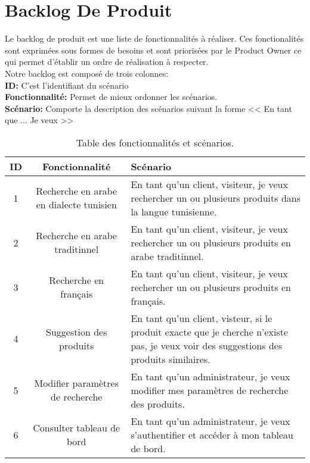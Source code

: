 \section{Backlog De Produit}
\noindent
\large
Le backlog de produit est une liste de fonctionnalités à réaliser. Ces fonctionalités sont exprimées sous formes de besoins et sont priorisées par le Product Owner ce qui permet d'établir un ordre de réalisation à respecter. \\
Notre backlog est composé de trois colonnes: \\
\textbf{ID: } C'est l'identifiant du scénario \\
\textbf{Fonctionnalité: } Permet de mieux ordonner les scénarios. \\
\textbf{Scénario: } Comporte la description des scénarios suivant la forme << En tant que ... Je veux >> \\

\begin{table}[H]
	\centering
	\begin{tabular}{|c|c|p{10cm}|}
		\hline
		\rowcolor{blue!20}
		\textbf{ID} & \textbf{Fonctionnalité}                 & \textbf{Scénario}                                                                                                                      \\ \hline
		1           & Recherche en arabe en dialecte tunisien & En tant qu'un client, visiteur, je veux rechercher un ou plusieurs produits dans la langue tunisienne.                                 \\ \hline
		2           & Recherche en arabe traditinnel            & En tant qu'un client, visiteur, je veux rechercher un ou plusieurs produits en arabe traditinnel.                                        \\ \hline
		3           & Recherche en français                   & En tant qu'un client, visiteur, je veux rechercher un ou plusieurs produits en français.                                               \\ \hline
		4           & Suggestion des produits                 & En tant qu'un client, visteur, si le produit exacte que je cherche n'existe pas, je veux voir des suggestions des produits similaires. \\ \hline

		5           & Modifier paramètres de recherche                 & En tant qu'un administrateur, je veux modifier mes paramètres de recherche des produits. \\ \hline

		6           & Consulter tableau de bord               & En tant qu'un administrateur, je veux s'authentifier et accéder à mon tableau de bord.                                                 \\  \hline
	\end{tabular}
	\caption{Table des fonctionnalités et scénarios.}
\end{table}

